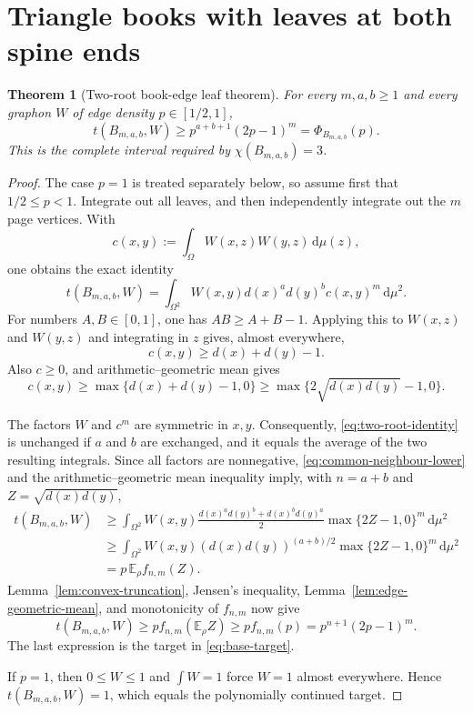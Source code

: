 \documentclass[11pt]{article}
\newtheorem{theorem}{Theorem}[section]
\newcommand{\dd}{\,\mathrm{d}}
\begin{document}
\section{Triangle books with leaves at both spine ends}

\begin{theorem}[Two-root book-edge leaf theorem]
\label{thm:two-root}
For every $m,a,b\geq1$ and every graphon $W$ of edge density
$p\in[1/2,1]$,
\[
 \boxed{
 t(B_{m,a,b},W)
 \geq p^{a+b+1}(2p-1)^m
 =\Phi_{B_{m,a,b}}(p).
 }
\]
This is the complete interval required by $\chi(B_{m,a,b})=3$.
\end{theorem}

\begin{proof}
The case $p=1$ is treated separately below, so assume first that
$1/2\leq p<1$.  Integrate out all leaves, and then independently integrate
out the $m$ page vertices.  With
\[
 c(x,y):=\int_\Omega W(x,z)W(y,z)\dd\mu(z),
\]
one obtains the exact identity
\begin{equation}
 t(B_{m,a,b},W)
 =\int_{\Omega^2}W(x,y)d(x)^a d(y)^b c(x,y)^m\dd\mu^2.
 \label{eq:two-root-identity}
\end{equation}
For numbers $A,B\in[0,1]$, one has $AB\geq A+B-1$.  Applying this to
$W(x,z)$ and $W(y,z)$ and integrating in $z$ gives, almost everywhere,
\[
 c(x,y)\geq d(x)+d(y)-1.
\]
Also $c\geq0$, and arithmetic--geometric mean gives
\[
 c(x,y)
 \geq\max\{d(x)+d(y)-1,0\}
 \geq\max\{2\sqrt{d(x)d(y)}-1,0\}.
 \label{eq:common-neighbour-lower}
\]

The factors $W$ and $c^m$ are symmetric in $x,y$.  Consequently,
\eqref{eq:two-root-identity} is unchanged if $a$ and $b$ are exchanged,
and it equals the average of the two resulting integrals.  Since all
factors are nonnegative, \eqref{eq:common-neighbour-lower} and the
arithmetic--geometric mean inequality imply, with $n=a+b$ and
$Z=\sqrt{d(x)d(y)}$,
\begin{align*}
 t(B_{m,a,b},W)
 &\geq\int_{\Omega^2}W(x,y)
 \frac{d(x)^a d(y)^b+d(x)^b d(y)^a}{2}
 \max\{2Z-1,0\}^m\dd\mu^2
 \\
 &\geq\int_{\Omega^2}W(x,y)
 (d(x)d(y))^{(a+b)/2}\max\{2Z-1,0\}^m\dd\mu^2
 \\
 &=p\,\mathbb E_\rho f_{n,m}(Z).
\end{align*}
Lemma~\ref{lem:convex-truncation}, Jensen's inequality,
Lemma~\ref{lem:edge-geometric-mean}, and monotonicity of $f_{n,m}$ now give
\[
 t(B_{m,a,b},W)
 \geq p f_{n,m}(\mathbb E_\rho Z)
 \geq p f_{n,m}(p)
 =p^{n+1}(2p-1)^m.
\]
The last expression is the target in \eqref{eq:base-target}.

If $p=1$, then $0\leq W\leq1$ and $\int W=1$ force $W=1$ almost
everywhere.  Hence $t(B_{m,a,b},W)=1$, which equals the polynomially
continued target.
\end{proof}
\end{document}
